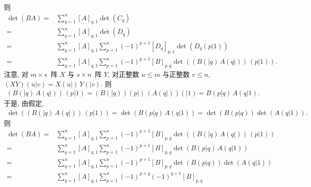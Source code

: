 \documentclass[../libro.tex]{subfiles}
\begin{document}
\begin{example}
    则
    \begin{align*}
        \det {(BA)}
        = {} &
        \sum_{q=1}^{n} {
            [A]_{q,1}
            \det {(C_q)}
        }
        \\
        = {} &
        \sum_{q=1}^{n} {
            [A]_{q,1}
            \det {(D_q)}
        }
        \\
        = {} &
        \sum_{q=1}^{n} {
            [A]_{q,1}
            \sum_{p=1}^{n} {
                (-1)^{p+1}
                [D_q]_{p,1}
                \det {(D_q (p|1))}
            }
        }
        \\
        = {} &
        \sum_{q=1}^{n} {
            [A]_{q,1}
            \sum_{p=1}^{n} {
                (-1)^{p+1}
                [B]_{p,q}
                \det {((B({|q})\, A({q|}))\, (p|1))}
            }
        }.
    \end{align*}
    注意, 对 \(m \times s\)~阵 \(X\)
    与 \(s \times n\)~阵 \(Y\),
    对正整数 \(u \leq m\)
    与正整数 \(v \leq n\),
    \((XY)(u|v) = X({u|})\, Y({|v})\).
    则
    \begin{align*}
        (B({|q})\, A({q|}))\, (p|1)
        = (B({|q}))({p|})\, (A({q|}))({|1})
        = B({p|q})\, A({q|1}).
    \end{align*}
    于是, 由假定,
    \begin{align*}
        \det {((B({|q})\, A({q|}))\, (p|1))}
        = \det {(B({p|q})\, A({q|1}))}
        = \det {(B({p|q}))} \det {(A({q|1}))}.
    \end{align*}
    则
    \begin{align*}
        \det {(BA)}
        = {} &
        \sum_{q=1}^{n} {
            [A]_{q,1}
            \sum_{p=1}^{n} {
                (-1)^{p+1}
                [B]_{p,q}
                \det {((B({|q})\, A({q|}))\, (p|1))}
            }
        }
        \\
        = {} &
        \sum_{q=1}^{n} {
            [A]_{q,1}
            \sum_{p=1}^{n} {
                (-1)^{p+1}
                [B]_{p,q}
                \det {(B({p|q})\, A({q|1}))}
            }
        }
        \\
        = {} &
        \sum_{q=1}^{n} {
            [A]_{q,1}
            \sum_{p=1}^{n} {
                (-1)^{p+1}
                [B]_{p,q}
                \det {(B({p|q}))} \det {(A({q|1}))}
            }
        }
        \\
        = {} &
        \sum_{q=1}^{n} {
            [A]_{q,1}
            \sum_{p=1}^{n} {
                (-1)^{p+q} (-1)^{q+1}
                [B]_{p,q}
}}
\end{align*}
\end{example}
\end{document}
